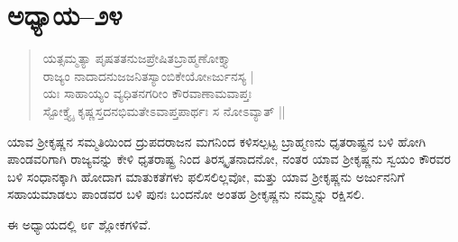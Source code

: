 \section{ಅಧ್ಯಾಯ–೨೪}

\begin{verse}
ಯತ್ಸಮ್ಮತ್ಯಾ ಪೃಷತತನುಜಪ್ರೇಷಿತಬ್ರಾಹ್ಮಣೋಕ್ತ್ಯಾ \\ ರಾಜ್ಯಂ ನಾದಾದನುಜಜನಿತಸ್ಯಾಂಬಿಕೇಯೋsರ್ಜುನಸ್ಯ |\\ ಯಃ ಸಾಹಾಯ್ಯಂ ವ್ಯಧಿತನಗರೀಂ ಕೌರವಾಣಾಮವಾಪ್ತಃ \\ ಸ್ಟೋಕ್ತ್ಯೈ ಕೃಷ್ಣಸ್ತದನಭಿಮತೇಽವಾಪ್ತಪಾರ್ಥಃ ಸ ನೋಽವ್ಯಾತ್ ||
\end{verse}

ಯಾವ ಶ‍್ರೀಕೃಷ್ಣನ ಸಮ್ಮತಿಯಿಂದ ದ್ರುಪದರಾಜನ ಮಗನಿಂದ ಕಳಿಸಲ್ಪಟ್ಟ ಬ್ರಾಹ್ಮಣನು ಧೃತರಾಷ್ಟ್ರನ ಬಳಿ ಹೋಗಿ ಪಾಂಡವರಿಗಾಗಿ ರಾಜ್ಯವನ್ನು ಕೇಳಿ ಧೃತರಾಷ್ಟ್ರ ನಿಂದ ತಿರಸ್ಕೃತನಾದನೋ, ನಂತರ ಯಾವ ಶ‍್ರೀಕೃಷ್ಣನು ಸ್ವಯಂ ಕೌರವರ ಬಳಿ ಸಂಧಾನಕ್ಕಾಗಿ ಹೋದಾಗ ಮಾತುಕತೆಗಳು ಫಲಿಸಲಿಲ್ಲವೋ, ಮತ್ತು ಯಾವ ಶ‍್ರೀಕೃಷ್ಣನು ಅರ್ಜುನನಿಗೆ ಸಹಾಯಮಾಡಲು ಪಾಂಡವರ ಬಳಿ ಪುನಃ ಬಂದನೋ ಅಂತಹ ಶ‍್ರೀಕೃಷ್ಣನು ನಮ್ಮನ್ನು ರಕ್ಷಿಸಲಿ.

ಈ ಅಧ್ಯಾಯದಲ್ಲಿ ೮೯ ಶ್ಲೋಕಗಳಿವೆ.

